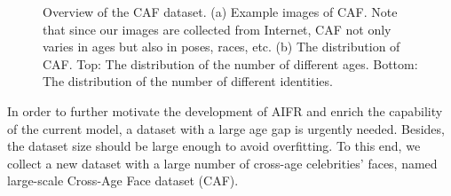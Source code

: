 \documentclass[runningheads]{llncs}
\begin{document}
\begin{figure}[t]
  \centering
  \caption{Overview of the CAF dataset. (a) Example images of CAF. Note that since our images are collected from Internet, CAF not only varies in ages but also in poses, races, etc. (b) The distribution of CAF. Top: The distribution of the number of different ages. Bottom: The distribution of the number of different identities. }
  \label{fig:1}
\end{figure}

In order to further motivate the development of AIFR and enrich the capability of the current model,
a dataset with a large age gap is urgently needed. Besides, the dataset size should be large enough to avoid overfitting. To this end, we collect a new dataset with a large number of cross-age celebrities' faces, named large-scale Cross-Age Face dataset (CAF).
\end{document}
